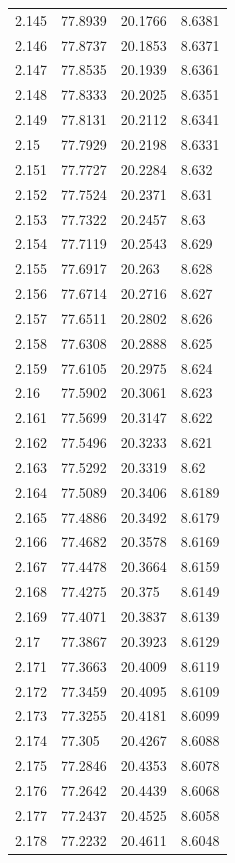 \begin{tabular}{llll}
2.145 & 77.8939 & 20.1766 & 8.6381 \\
2.146 & 77.8737 & 20.1853 & 8.6371 \\
2.147 & 77.8535 & 20.1939 & 8.6361 \\
2.148 & 77.8333 & 20.2025 & 8.6351 \\
2.149 & 77.8131 & 20.2112 & 8.6341 \\
2.15 & 77.7929 & 20.2198 & 8.6331 \\
2.151 & 77.7727 & 20.2284 & 8.632 \\
2.152 & 77.7524 & 20.2371 & 8.631 \\
2.153 & 77.7322 & 20.2457 & 8.63 \\
2.154 & 77.7119 & 20.2543 & 8.629 \\
2.155 & 77.6917 & 20.263 & 8.628 \\
2.156 & 77.6714 & 20.2716 & 8.627 \\
2.157 & 77.6511 & 20.2802 & 8.626 \\
2.158 & 77.6308 & 20.2888 & 8.625 \\
2.159 & 77.6105 & 20.2975 & 8.624 \\
2.16 & 77.5902 & 20.3061 & 8.623 \\
2.161 & 77.5699 & 20.3147 & 8.622 \\
2.162 & 77.5496 & 20.3233 & 8.621 \\
2.163 & 77.5292 & 20.3319 & 8.62 \\
2.164 & 77.5089 & 20.3406 & 8.6189 \\
2.165 & 77.4886 & 20.3492 & 8.6179 \\
2.166 & 77.4682 & 20.3578 & 8.6169 \\
2.167 & 77.4478 & 20.3664 & 8.6159 \\
2.168 & 77.4275 & 20.375 & 8.6149 \\
2.169 & 77.4071 & 20.3837 & 8.6139 \\
2.17 & 77.3867 & 20.3923 & 8.6129 \\
2.171 & 77.3663 & 20.4009 & 8.6119 \\
2.172 & 77.3459 & 20.4095 & 8.6109 \\
2.173 & 77.3255 & 20.4181 & 8.6099 \\
2.174 & 77.305 & 20.4267 & 8.6088 \\
2.175 & 77.2846 & 20.4353 & 8.6078 \\
2.176 & 77.2642 & 20.4439 & 8.6068 \\
2.177 & 77.2437 & 20.4525 & 8.6058 \\
2.178 & 77.2232 & 20.4611 & 8.6048 \\

\end{tabular}
